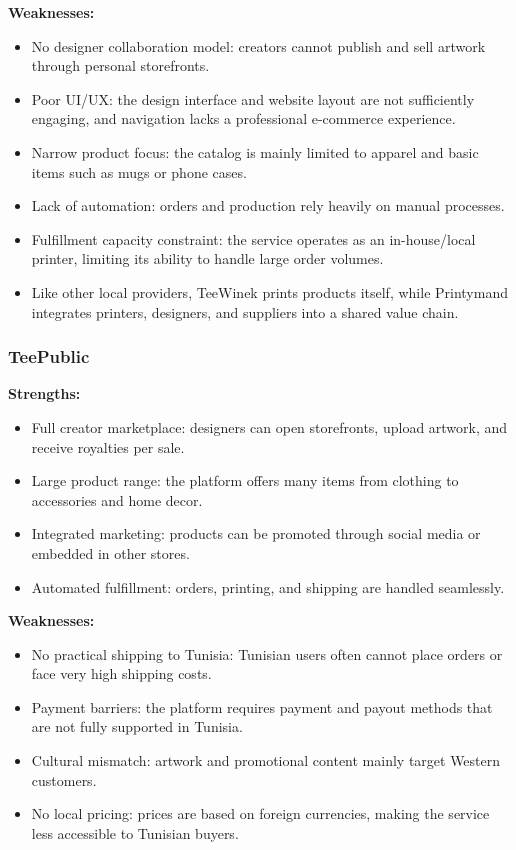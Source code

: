 \textbf{Weaknesses:}
\begin{itemize}
    \item No designer collaboration model: creators cannot publish and sell artwork through personal storefronts.
    \item Poor UI/UX: the design interface and website layout are not sufficiently engaging, and navigation lacks a professional e-commerce experience.
    \item Narrow product focus: the catalog is mainly limited to apparel and basic items such as mugs or phone cases.
    \item Lack of automation: orders and production rely heavily on manual processes.
    \item Fulfillment capacity constraint: the service operates as an in-house/local printer, limiting its ability to handle large order volumes.
    \item Like other local providers, TeeWinek prints products itself, while Printymand integrates printers, designers, and suppliers into a shared value chain.
\end{itemize}

\subsubsection{TeePublic}
\textbf{Strengths:}
\begin{itemize}
    \item Full creator marketplace: designers can open storefronts, upload artwork, and receive royalties per sale.
    \item Large product range: the platform offers many items from clothing to accessories and home decor.
    \item Integrated marketing: products can be promoted through social media or embedded in other stores.
    \item Automated fulfillment: orders, printing, and shipping are handled seamlessly.
\end{itemize}

\textbf{Weaknesses:}
\begin{itemize}
    \item No practical shipping to Tunisia: Tunisian users often cannot place orders or face very high shipping costs.
    \item Payment barriers: the platform requires payment and payout methods that are not fully supported in Tunisia.
    \item Cultural mismatch: artwork and promotional content mainly target Western customers.
    \item No local pricing: prices are based on foreign currencies, making the service less accessible to Tunisian buyers.
\end{itemize}

